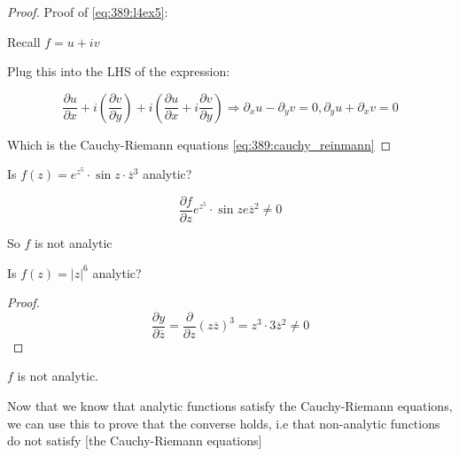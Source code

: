 \documentclass[../notes.tex]{subfiles}
\begin{document}
\begin{proof}
	Proof of \eqref{eq:389:l4ex5}:

	Recall $ f = u+iv $ 

	Plug this into the LHS of the expression:

	\begin{equation}
		\frac{\partial u}{\partial x}  + i(\frac{\partial v}{\partial y} ) + i(\frac{\partial u}{\partial x}  + i \frac{\partial v}{\partial y} ) \Rightarrow \partial_x u - \partial_y v = 0, \partial_y u + \partial_x v = 0
	\end{equation}

	Which is the Cauchy-Riemann equations \eqref{eq:389:cauchy_reinmann}
	
\end{proof}


\begin{example}
	Is $ f(z) = e^{z^5} \cdot  \sin z \cdot  \overline{z}^3 $  analytic?

	\begin{equation}
		\frac{\partial f}{\partial z} e^{z^5} \cdot  \sin z e \overline{z}^2 \neq 0
	\end{equation}

	So $ f $ is not analytic
\end{example}


\begin{example}
	Is $ f(z) = |z|^6 $ analytic?

	\begin{proof}
	\begin{equation}
		\frac{\partial y}{\partial \overline{z}} = \frac{\partial}{\partial z} (z \overline{z})^3 = z^3 \cdot 3 \overline{z}^2 \neq 0
	\end{equation} 
	\end{proof}

	$ f $ is not analytic.
	
\end{example}

Now that we know that analytic functions satisfy the Cauchy-Riemann equations, we can use this to prove that the converse holds, i.e that non-analytic functions do not satisfy [the Cauchy-Riemann equations]
\end{document}
